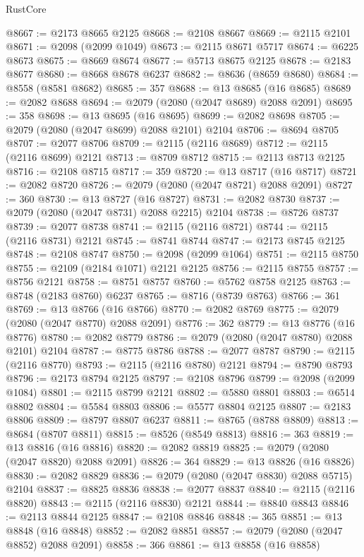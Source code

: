 \begin{lexlean}{RustCore}
\begin{coremodule}
@8667 := @2173 @8665 @2125
@8668 := @2108 @8667
@8669 := @2115 @2101
@8671 := @2098 (@2099 @1049)
@8673 := @2115 @8671 @5717
@8674 := @6225 @8673
@8675 := @8669 @8674
@8677 := @5713 @8675 @2125
@8678 := @2183 @8677
@8680 := @8668 @8678 @6237
@8682 := @8636 (@8659 @8680)
@8684 := @8558 (@8581 @8682)
@8685 := 357
@8688 := @13 @8685 (@16 @8685)
@8689 := @2082 @8688
@8694 := @2079 (@2080 (@2047 @8689) @2088 @2091)
@8695 := 358
@8698 := @13 @8695 (@16 @8695)
@8699 := @2082 @8698
@8705 := @2079 (@2080 (@2047 @8699) @2088 @2101) @2104
@8706 := @8694 @8705
@8707 := @2077 @8706
@8709 := @2115 (@2116 @8689)
@8712 := @2115 (@2116 @8699) @2121
@8713 := @8709 @8712
@8715 := @2113 @8713 @2125
@8716 := @2108 @8715
@8717 := 359
@8720 := @13 @8717 (@16 @8717)
@8721 := @2082 @8720
@8726 := @2079 (@2080 (@2047 @8721) @2088 @2091)
@8727 := 360
@8730 := @13 @8727 (@16 @8727)
@8731 := @2082 @8730
@8737 := @2079 (@2080 (@2047 @8731) @2088 @2215) @2104
@8738 := @8726 @8737
@8739 := @2077 @8738
@8741 := @2115 (@2116 @8721)
@8744 := @2115 (@2116 @8731) @2121
@8745 := @8741 @8744
@8747 := @2173 @8745 @2125
@8748 := @2108 @8747
@8750 := @2098 (@2099 @1064)
@8751 := @2115 @8750
@8755 := @2109 (@2184 @1071) @2121 @2125
@8756 := @2115 @8755
@8757 := @8756 @2121
@8758 := @8751 @8757
@8760 := @5762 @8758 @2125
@8763 := @8748 (@2183 @8760) @6237
@8765 := @8716 (@8739 @8763)
@8766 := 361
@8769 := @13 @8766 (@16 @8766)
@8770 := @2082 @8769
@8775 := @2079 (@2080 (@2047 @8770) @2088 @2091)
@8776 := 362
@8779 := @13 @8776 (@16 @8776)
@8780 := @2082 @8779
@8786 := @2079 (@2080 (@2047 @8780) @2088 @2101) @2104
@8787 := @8775 @8786
@8788 := @2077 @8787
@8790 := @2115 (@2116 @8770)
@8793 := @2115 (@2116 @8780) @2121
@8794 := @8790 @8793
@8796 := @2173 @8794 @2125
@8797 := @2108 @8796
@8799 := @2098 (@2099 @1084)
@8801 := @2115 @8799 @2121
@8802 := @5880 @8801
@8803 := @6514 @8802
@8804 := @5584 @8803
@8806 := @5577 @8804 @2125
@8807 := @2183 @8806
@8809 := @8797 @8807 @6237
@8811 := @8765 (@8788 @8809)
@8813 := @8684 (@8707 @8811)
@8815 := @8526 (@8549 @8813)
@8816 := 363
@8819 := @13 @8816 (@16 @8816)
@8820 := @2082 @8819
@8825 := @2079 (@2080 (@2047 @8820) @2088 @2091)
@8826 := 364
@8829 := @13 @8826 (@16 @8826)
@8830 := @2082 @8829
@8836 := @2079 (@2080 (@2047 @8830) @2088 @5715) @2104
@8837 := @8825 @8836
@8838 := @2077 @8837
@8840 := @2115 (@2116 @8820)
@8843 := @2115 (@2116 @8830) @2121
@8844 := @8840 @8843
@8846 := @2113 @8844 @2125
@8847 := @2108 @8846
@8848 := 365
@8851 := @13 @8848 (@16 @8848)
@8852 := @2082 @8851
@8857 := @2079 (@2080 (@2047 @8852) @2088 @2091)
@8858 := 366
@8861 := @13 @8858 (@16 @8858)

\end{coremodule}
\end{lexlean}
